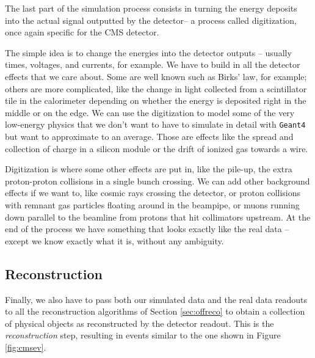 The last part of the simulation process consists in turning the energy deposits into the actual signal outputted by the detector-- a process called digitization, once again specific for the CMS detector.

The simple idea is to change the energies into the detector outputs – usually times, voltages, and currents, for example. We have to build in all the detector effects that we care about. Some are well known such as Birks’ law, for example; others are more complicated, like the change in light collected from a scintillator tile in the calorimeter depending on whether the energy is deposited right in the middle or on the edge. We can use the digitization to model some of the very low-energy physics that we don’t want to have to simulate in detail with \texttt{Geant4} but want to approximate to an average. Those are effects like the spread and collection of charge in a silicon module or the drift of ionized gas towards a wire.

Digitization is where some other effects are put in, like the pile-up, the extra proton-proton collisions in a single bunch crossing. We can add other background effects if we want to, like cosmic rays crossing the detector, or proton collisions with remnant gas particles floating around in the beampipe, or muons running down parallel to the beamline from protons that hit collimators upstream. 
At the end of the process we have something that looks exactly like the real data – except we know exactly what it is, without any ambiguity.

\subsection{Reconstruction}
Finally, we also have to pass both our simulated data and the real data readouts to all the reconstruction algorithms of Section \ref{sec:offreco} to obtain a collection of physical objects as reconstructed by the detector readout. This is the \emph{reconstruction} step, resulting in events similar to the one shown in Figure \ref{fig:cmsev}.

